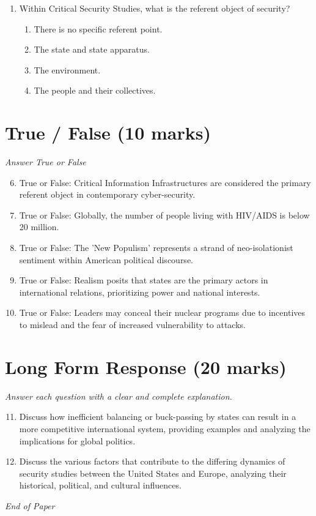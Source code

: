 \documentclass[12pt]{article}
\begin{document}
\begin{enumerate}[label=\arabic*.]
\begin{enumerate}[label=(\alph*)]
    \item the president of the United States.
    \item the secretary of defense.
    \item the chairman of the Joint Chiefs of Staff.
    \item Congress.
\end{enumerate}
\item Within Critical Security Studies, what is the referent object of security?
\begin{enumerate}[label=(\alph*)]
    \item There is no specific referent point.
    \item The state and state apparatus.
    \item The environment.
    \item The people and their collectives.
\end{enumerate}
\end{enumerate}

\section*{True / False (10 marks)}
\textit{Answer True or False}
\begin{enumerate}[label=\arabic*.]
\setcounter{enumi}{5}
\item True or False: Critical Information Infrastructures are considered the primary referent object in contemporary cyber-security.
\item True or False: Globally, the number of people living with HIV/AIDS is below 20 million.
\item True or False: The 'New Populism' represents a strand of neo-isolationist sentiment within American political discourse.
\item True or False: Realism posits that states are the primary actors in international relations, prioritizing power and national interests.
\item True or False: Leaders may conceal their nuclear programs due to incentives to mislead and the fear of increased vulnerability to attacks.
\end{enumerate}

\section*{Long Form Response (20 marks)}
\textit{Answer each question with a clear and complete explanation.}
\begin{enumerate}[label=\arabic*.]
\setcounter{enumi}{10}
\item Discuss how inefficient balancing or buck-passing by states can result in a more competitive international system, providing examples and analyzing the implications for global politics.
\item Discuss the various factors that contribute to the differing dynamics of security studies between the United States and Europe, analyzing their historical, political, and cultural influences.
\end{enumerate}

\vfill
\noindent\textit{End of Paper}
\end{document}
